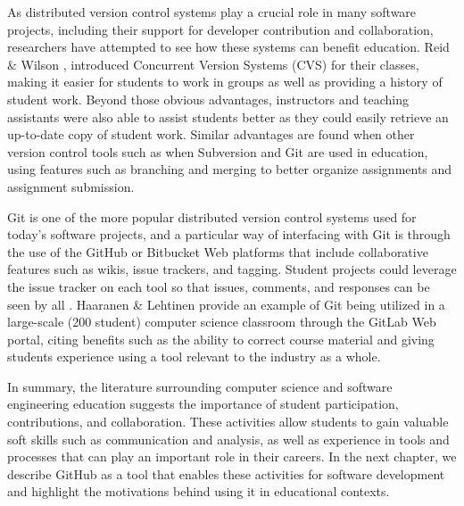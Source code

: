 As distributed version control systems play a crucial role in many software projects, including their support for developer contribution and collaboration, researchers have attempted to see how these systems can benefit education. Reid \& Wilson \cite{reid2005learning}, introduced Concurrent Version Systems (CVS) for their classes, making it easier for students to work in groups as well as providing a history of student work. Beyond those obvious advantages, instructors and teaching assistants were also able to assist students better as they could easily retrieve an up-to-date copy of student work. Similar advantages are found when other version control tools such as when Subversion \cite{clifton2007subverting} and Git \cite{griffin2013github} are used in education, using features such as branching and merging to better organize assignments and assignment submission.

Git is one of the more popular distributed version control systems used for today's software projects, and a particular way of interfacing with Git is through the use of the GitHub or Bitbucket Web platforms that include collaborative features such as wikis, issue trackers, and tagging. Student projects could leverage the issue tracker on each tool so that issues, comments, and responses can be seen by all \cite{kelleher2014employing}. Haaranen \& Lehtinen \cite{haaranen2015teaching} provide an example of Git being utilized in a large-scale (200 student) computer science classroom through the GitLab Web portal, citing benefits such as the ability to correct course material and giving students experience using a tool relevant to the industry as a whole.

In summary, the literature surrounding computer science and software engineering education suggests the importance of student participation, contributions, and collaboration. These activities allow students to gain valuable soft skills such as communication and analysis, as well as experience in tools and processes that  can play an important role in their careers. In the next chapter, we describe GitHub as a tool that enables these activities for software development and highlight the motivations behind using it in educational contexts.





